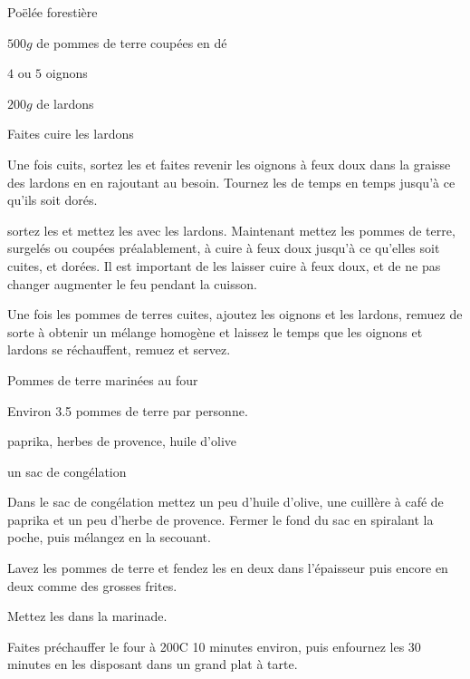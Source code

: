 \begin{recette}{Poëlée forestière}
\begin{ingredients}
\item $500\unit{g}$ de pommes de terre coupées en dé
\item $4$ ou $5$ oignons
\item $200\unit{g}$ de lardons
\end{ingredients}

\begin{preparation}
\item Faites cuire les lardons
\item Une fois cuits, sortez les et faites revenir les oignons à feux doux dans la graisse des lardons en en rajoutant au besoin. Tournez les de temps en temps jusqu'à ce qu'ils soit dorés.
\item sortez les et mettez les avec les lardons. Maintenant mettez les pommes de terre, surgelés ou coupées préalablement, à cuire à feux doux jusqu'à ce qu'elles soit cuites, et dorées. Il est important de les laisser cuire à feux doux, et de ne pas changer augmenter le feu pendant la cuisson.
\item Une fois les pommes de terres cuites, ajoutez les oignons et les lardons, remuez de sorte à obtenir un mélange homogène et laissez le temps que les oignons et lardons se réchauffent, remuez et servez.
\end{preparation}

\end{recette}

\begin{recette}{Pommes de terre marinées au four}
\begin{ingredients}
\item Environ 3.5 pommes de terre par personne.
\item paprika, herbes de provence, huile d'olive
\item un sac de congélation
\end{ingredients}

\begin{preparation}
\item Dans le sac de congélation mettez un peu d'huile d'olive, une cuillère à café de paprika et un peu d'herbe de provence. Fermer le fond du sac en spiralant la poche, puis mélangez en la secouant.
\item Lavez les pommes de terre et fendez les en deux dans l'épaisseur puis encore en deux comme des grosses frites.
\item Mettez les dans la marinade.
\end{preparation}

\begin{cuisson}
Faites préchauffer le four à 200\degres C 10 minutes environ, puis enfournez les 30 minutes en les disposant dans un grand plat à tarte.
\end{cuisson}
\end{recette}


